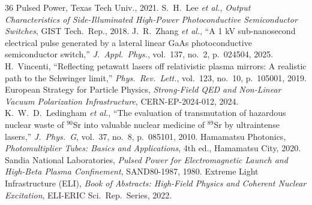 \documentclass[11pt,journal,compsoc]{IEEEtran}
\begin{document}
\begin{thebibliography}{36}
  Pulsed Power, Texas Tech Univ., 2021.
 S.~H.~Lee \emph{et al.}, \emph{Output
  Characteristics of Side-Illuminated High-Power Photoconductive
  Semiconductor Switches}, GIST Tech.\ Rep., 2018.
 J.~R.~Zhang \emph{et al.}, ``A 1 kV
  sub-nanosecond electrical pulse generated by a lateral linear GaAs
  photoconductive semiconductor switch,'' \emph{J.\ Appl.\ Phys.},
  vol.~137, no.~2, p.~024504, 2025.
 H.~Vincenti, ``Reflecting petawatt lasers off
  relativistic plasma mirrors: A realistic path to the Schwinger limit,''
  \emph{Phys.\ Rev.\ Lett.}, vol.~123, no.~10, p.~105001, 2019.
 European Strategy for Particle Physics,
  \emph{Strong-Field QED and Non-Linear Vacuum Polarization
  Infrastructure}, CERN-EP-2024-012, 2024.
 K.~W.~D.~Ledingham \emph{et al.}, ``The evaluation
  of transmutation of hazardous nuclear waste of $^{90}$Sr into valuable
  nuclear medicine of $^{89}$Sr by ultraintense lasers,'' \emph{J.\ Phys.\
  G}, vol.~37, no.~8, p.~085101, 2010.
 Hamamatsu Photonics, \emph{Photomultiplier Tubes:
  Basics and Applications}, 4th ed., Hamamatsu City, 2020.
 Sandia National Laboratories, \emph{Pulsed Power for
  Electromagnetic Launch and High-Beta Plasma Confinement}, SAND80-1987,
  1980.
 Extreme Light Infrastructure (ELI), \emph{Book of
  Abstracts: High-Field Physics and Coherent Nuclear Excitation}, ELI-ERIC
  Sci.\ Rep.\ Series, 2022.
\end{thebibliography}
\end{document}
